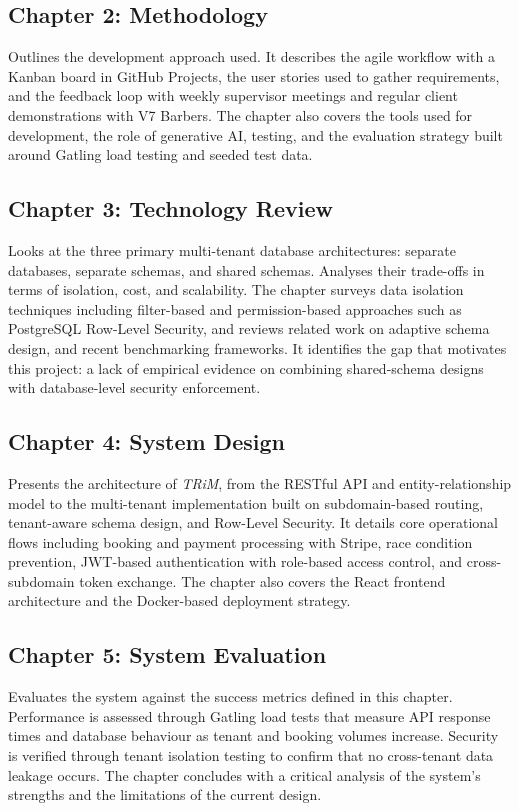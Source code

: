\subsection*{Chapter 2: Methodology}
Outlines the development approach used. It describes the agile workflow with a Kanban board in GitHub Projects, the user stories used to gather requirements, and the feedback loop with weekly supervisor meetings and regular client demonstrations with V7 Barbers. The chapter also covers the tools used for development, the role of generative AI, testing, and the evaluation strategy built around Gatling load testing and seeded test data.

\subsection*{Chapter 3: Technology Review}
Looks at the three primary multi-tenant database architectures: separate databases, separate schemas, and shared schemas. Analyses their trade-offs in terms of isolation, cost, and scalability. The chapter surveys data isolation techniques including filter-based and permission-based approaches such as PostgreSQL Row-Level Security, and reviews related work on adaptive schema design, and recent benchmarking frameworks. It identifies the gap that motivates this project: a lack of empirical evidence on combining shared-schema designs with database-level security enforcement.

\subsection*{Chapter 4: System Design}
Presents the architecture of \textit{TRiM}, from the RESTful API and entity-relationship model to the multi-tenant implementation built on subdomain-based routing, tenant-aware schema design, and Row-Level Security. It details core operational flows including booking and payment processing with Stripe, race condition prevention, JWT-based authentication with role-based access control, and cross-subdomain token exchange. The chapter also covers the React frontend architecture and the Docker-based deployment strategy.

\subsection*{Chapter 5: System Evaluation}
Evaluates the system against the success metrics defined in this chapter. Performance is assessed through Gatling load tests that measure API response times and database behaviour as tenant and booking volumes increase. Security is verified through tenant isolation testing to confirm that no cross-tenant data leakage occurs. The chapter concludes with a critical analysis of the system's strengths and the limitations of the current design.

